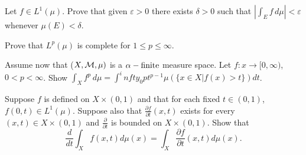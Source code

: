 \documentclass[bbb]{report}
\def\ds{\displaystyle}
\def\M{{\cal M}}
\begin{document}
\begin{large}
\begin{description}
\vspace{.15in}

\item[5.]
Let $f\in L^1(\mu)$. Prove that given $\varepsilon >0$ there
exists $\delta>0$ such that $\left|\ds\int_E f\,d\mu\right|<\varepsilon$
whenever $\mu(E)<\delta$.

\vspace{.15in}

\item[6.]
Prove that $L^p(\mu)$ is complete for $1\leq p\leq \infty$.


\vspace{.15in}

\item[7.]
Assume now that ($X,\M, \mu)$ is a $\alpha-\hbox{finite}$
measure space. Let $f:x\to [0,\infty)$, $0<p<\infty$.
Show
$\ds\int_X f^p\,d\mu=\ds\int^infty_0 pt^{p-1}\mu(\{x\in X|f(x)>t\})dt$.


\vspace{.15in}

\item[8.]
Suppose $f$ is defined on $X\times (0,1)$ and that for each fixed
$t\in(0,1)$, $f(0,t)\in L^1(\mu)$.
Suppose also that $\ds\frac{\partial f}{\partial t}(x,t)$ exists
for every $(x,t)\in X\times (0,1)$ and $\ds\frac{\partial}{\partial t}$
is bounded on $X\times(0,1)$. Show that
$$ \frac{d}{dt}\int_X f(x,t)d\mu(x)
   =\int_X \frac{\partial f}{\partial t} (x,t) d\mu(x).
   $$




\vfill



\end{description}

\end{large}
\end{document}
